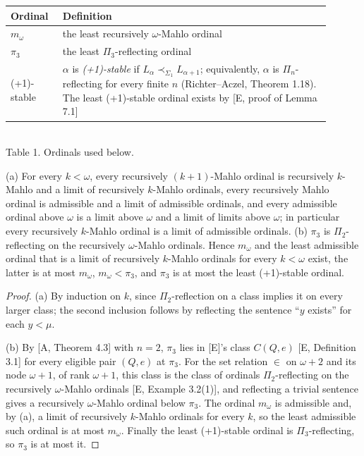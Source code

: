 \documentclass[11pt]{article}
\begin{document}
\begin{center}\begin{tabular}{p{0.14\linewidth}p{0.76\linewidth}}
\toprule
Ordinal & Definition \\
\midrule
$m_\omega$ & the least recursively $\omega$-Mahlo ordinal \\
$\pi_3$ & the least $\Pi_3$-reflecting ordinal \\
(+1)-stable & $\alpha$ is \emph{(+1)-stable} if $L_\alpha \prec_{\Sigma_1} L_{\alpha+1}$; equivalently, $\alpha$ is
$\Pi_n$-reflecting for every finite $n$ (Richter--Aczel, Theorem 1.18). The least (+1)-stable ordinal exists by [E,
proof of Lemma 7.1] \\
\bottomrule
\end{tabular}\\[0.4em]Table 1. Ordinals used below.\end{center}

\begin{statement} (a) For every $k < \omega$, every recursively $(k+1)$-Mahlo ordinal is
recursively $k$-Mahlo and a limit of recursively $k$-Mahlo ordinals, every recursively Mahlo ordinal is admissible
and a limit of admissible ordinals, and every admissible ordinal above $\omega$ is a limit above $\omega$ and a limit
of limits above $\omega$; in particular every recursively $k$-Mahlo ordinal is a limit of admissible
ordinals.
(b) $\pi_3$ is $\Pi_2$-reflecting on the recursively $\omega$-Mahlo ordinals. Hence $m_\omega$ and the least
admissible ordinal that is a limit of recursively $k$-Mahlo ordinals for every $k < \omega$ exist, the latter is at
most $m_\omega$, $m_\omega < \pi_3$, and $\pi_3$ is at most the least (+1)-stable ordinal.
\end{statement}

\begin{proof}
(a) By induction on $k$, since $\Pi_2$-reflection on a class implies it on every larger class; the second inclusion
follows by reflecting the sentence ``$y$ exists'' for each $y < \mu$.

(b) By [A, Theorem 4.3] with $n = 2$, $\pi_3$ lies in [E]'s class $C(Q, e)$ [E, Definition 3.1] for every eligible
pair $(Q,e)$ at $\pi_3$. For the set relation $\in$ on $\omega+2$ and its node $\omega+1$, of rank $\omega+1$, this class
is the class of ordinals $\Pi_2$-reflecting on the recursively $\omega$-Mahlo ordinals [E, Example 3.2(1)], and
reflecting a trivial sentence gives a recursively $\omega$-Mahlo ordinal below $\pi_3$. The ordinal $m_\omega$ is
admissible and, by (a), a limit of recursively $k$-Mahlo ordinals for every $k$, so the least admissible such ordinal is
at most $m_\omega$. Finally the least (+1)-stable ordinal is $\Pi_3$-reflecting, so $\pi_3$ is at most it.
\end{proof}
\end{document}
